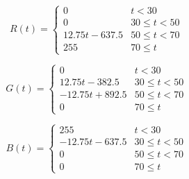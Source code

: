 \documentclass{article}
\newcommand{\m}{\text{12.75}}
\begin{document}
\begin{equation*}
    R(t)=
    \begin{cases}
      0				& t < 30 \\
      0				& 30 \leq t < 50 \\
      \m t-637.5	& 50 \leq t < 70 \\
      255			& 70 \leq t
    \end{cases}
\end{equation*}

\begin{equation*}
    G(t)=
    \begin{cases}
      0				& t < 30 \\
      \m t-382.5	& 30 \leq t < 50 \\
      -\m t+892.5	& 50 \leq t < 70 \\
      0			& 70 \leq t
    \end{cases}
\end{equation*}

\begin{equation*}
    B(t)=
    \begin{cases}
      255			& t < 30 \\
      -\m t-637.5	& 30 \leq t < 50 \\
      0				& 50 \leq t < 70 \\
      0				& 70 \leq t
    \end{cases}
\end{equation*}
\end{document}
